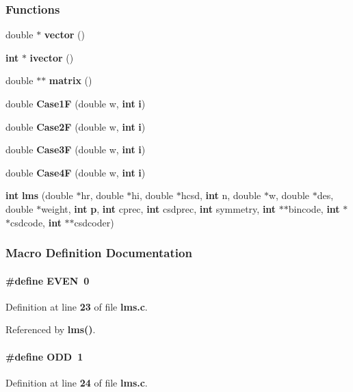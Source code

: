 \subsubsection*{Functions}
\begin{DoxyCompactItemize}
\item 
double $\ast$ {\bf vector} ()
\item 
{\bf int} $\ast$ {\bf ivector} ()
\item 
double $\ast$$\ast$ {\bf matrix} ()
\item 
double {\bf Case1F} (double w, {\bf int} {\bf i})
\item 
double {\bf Case2F} (double w, {\bf int} {\bf i})
\item 
double {\bf Case3F} (double w, {\bf int} {\bf i})
\item 
double {\bf Case4F} (double w, {\bf int} {\bf i})
\item 
{\bf int} {\bf lms} (double $\ast$hr, double $\ast$hi, double $\ast$hcsd, {\bf int} n, double $\ast$w, double $\ast$des, double $\ast$weight, {\bf int} {\bf p}, {\bf int} cprec, {\bf int} csdprec, {\bf int} symmetry, {\bf int} $\ast$$\ast$bincode, {\bf int} $\ast$$\ast$csdcode, {\bf int} $\ast$$\ast$csdcoder)
\end{DoxyCompactItemize}


\subsubsection{Macro Definition Documentation}
\paragraph[{E\+V\+EN}]{\setlength{\rightskip}{0pt plus 5cm}\#define E\+V\+EN~0}\label{lms_8c_a0ecdd7deb868e0319b01e42a1d9db86a}


Definition at line {\bf 23} of file {\bf lms.\+c}.



Referenced by {\bf lms()}.

\paragraph[{O\+DD}]{\setlength{\rightskip}{0pt plus 5cm}\#define O\+DD~1}\label{lms_8c_a9fa4b8c9552dae40afdc18558bfd4893}


Definition at line {\bf 24} of file {\bf lms.\+c}.



